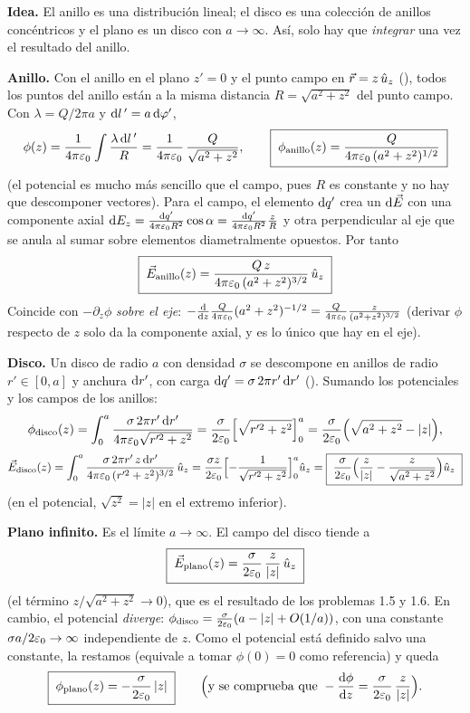 \begin{resolucion}
\textbf{Idea.} El anillo es una distribución lineal; el disco es una colección de anillos concéntricos y el plano es un disco con $a\to\infty$. Así, solo hay que \emph{integrar} una vez el resultado del anillo.

\textbf{Anillo.} Con el anillo en el plano $z'=0$ y el punto campo en $\vec{r}=z\,\hat{u}_{z}$ (), todos los puntos del anillo están a la misma distancia $R=\sqrt{a^{2}+z^{2}}$ del punto campo. Con $\lambda=Q/2\pi a$ y $\mathrm{d} l\,'=a\,\mathrm{d}\varphi'$,
\[
  \phi(z)=\frac{1}{4\pi\varepsilon_{0}}\int\frac{\lambda\,\mathrm{d} l\,'}{R}=\frac{1}{4\pi\varepsilon_{0}}\,\frac{Q}{\sqrt{a^{2}+z^{2}}},\qquad\boxed{\;\phi_{\mathrm{anillo}}(z)=\frac{Q}{4\pi\varepsilon_{0}\,(a^{2}+z^{2})^{1/2}}\;}
\]
(el potencial es mucho más sencillo que el campo, pues $R$ es constante y no hay que descomponer vectores). Para el campo, el elemento $\mathrm{d} q'$ crea un $\mathrm{d}\vec{E}$ con una componente axial $\mathrm{d} E_z=\frac{\mathrm{d} q'}{4\pi\varepsilon_{0} R^{2}}\cos\alpha=\frac{\mathrm{d} q'}{4\pi\varepsilon_{0} R^{2}}\frac{z}{R}$
y otra perpendicular al eje que se anula al sumar sobre elementos diametralmente opuestos. Por tanto
\[
  \boxed{\;\vec{E}_{\mathrm{anillo}}(z)=\frac{Q\,z}{4\pi\varepsilon_{0}\,(a^{2}+z^{2})^{3/2}}\,\hat{u}_{z}\;}
\]
Coincide con $-\partial_z\phi$ \emph{sobre el eje}: $-\frac{\mathrm{d}}{\mathrm{d} z}\frac{Q}{4\pi\varepsilon_{0}}(a^{2}+z^{2})^{-1/2}=\frac{Q}{4\pi\varepsilon_{0}}\frac{z}{(a^{2}+z^{2})^{3/2}}$ (derivar $\phi$ respecto de $z$ solo da la componente axial, y es lo único que hay en el eje).

\textbf{Disco.} Un disco de radio $a$ con densidad $\sigma$ se descompone en anillos de radio $r'\in[0,a]$ y anchura $\mathrm{d} r'$, con carga $\mathrm{d} q'=\sigma\,2\pi r'\,\mathrm{d} r'$ (). Sumando los potenciales y los campos de los anillos:
\[
  \phi_{\mathrm{disco}}(z)=\int_{0}^{a}\frac{\sigma\,2\pi r'\,\mathrm{d} r'}{4\pi\varepsilon_{0}\sqrt{r'^{2}+z^{2}}}=\frac{\sigma}{2\varepsilon_{0}}\Bigl[\sqrt{r'^{2}+z^{2}}\Bigr]_{0}^{a}=\frac{\sigma}{2\varepsilon_{0}}\Bigl(\sqrt{a^{2}+z^{2}}-\lvert z\rvert\Bigr),
\]
\[
  \vec{E}_{\mathrm{disco}}(z)=\int_{0}^{a}\frac{\sigma\,2\pi r'\,z\,\mathrm{d} r'}{4\pi\varepsilon_{0}\,(r'^{2}+z^{2})^{3/2}}\,\hat{u}_{z}=\frac{\sigma z}{2\varepsilon_{0}}\Bigl[-\frac{1}{\sqrt{r'^{2}+z^{2}}}\Bigr]_{0}^{a}\hat{u}_{z}
  =\boxed{\;\frac{\sigma}{2\varepsilon_{0}}\Bigl(\frac{z}{\lvert z\rvert}-\frac{z}{\sqrt{a^{2}+z^{2}}}\Bigr)\hat{u}_{z}\;}
\]
(en el potencial, $\sqrt{z^{2}}=\lvert z\rvert$ en el extremo inferior).

\textbf{Plano infinito.} Es el límite $a\to\infty$. El campo del disco tiende a
\[
  \boxed{\;\vec{E}_{\mathrm{plano}}(z)=\frac{\sigma}{2\varepsilon_{0}}\,\frac{z}{\lvert z\rvert}\,\hat{u}_{z}\;}
\]
(el término $z/\sqrt{a^{2}+z^{2}}\to0$), que es el resultado de los problemas 1.5 y 1.6. En cambio, el potencial \emph{diverge}: $\phi_{\mathrm{disco}}=\frac{\sigma}{2\varepsilon_{0}}(a-\lvert z\rvert+O(1/a))$, con una constante $\sigma a/2\varepsilon_{0}\to\infty$ independiente de $z$. Como el potencial
está definido salvo una constante, la restamos (equivale a tomar $\phi(0)=0$ como referencia) y queda
\[
  \boxed{\;\phi_{\mathrm{plano}}(z)=-\frac{\sigma}{2\varepsilon_{0}}\,\lvert z\rvert\;}\qquad\Bigl(\text{y se comprueba que }-\frac{\mathrm{d}\phi}{\mathrm{d} z}=\frac{\sigma}{2\varepsilon_{0}}\,\frac{z}{\lvert z\rvert}\Bigr).
\]
\end{resolucion}

